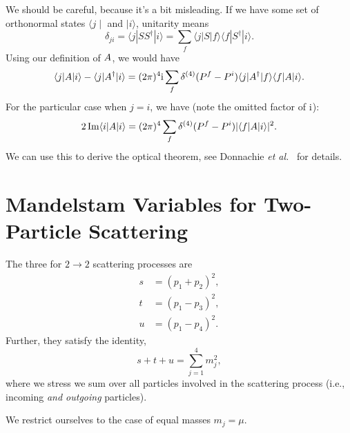 \M
We should be careful, because it's a bit misleading. If we have some set
of orthonormal states $\langle j\mid$ and $\mid i\rangle$, unitarity
means
\begin{equation}
  \delta_{ji} = \langle j| SS^{\dagger}| i\rangle
  =\sum_{f}\langle j| S| f\rangle\langle f| S^{\dagger}| i\rangle.
\end{equation}
Using our definition of $A$, we would have
\begin{equation}
\langle j|A|i\rangle - \langle j|A^{\dagger}|i\rangle
=(2\pi)^{4}\mathrm{i}\sum_{f}\delta^{(4)}(P^{f}-P^{i})
\langle j|A^{\dagger}|f\rangle\langle f|A|i\rangle.
\end{equation}
For the particular case when $j=i$, we have (note the omitted factor of $\mathrm{i}$):
\begin{equation}
2\operatorname{Im}\langle i|A|i\rangle
=(2\pi)^{4}\sum_{f}\delta^{(4)}(P^{f}-P^{i}) |\langle f|A|i\rangle|^{2}.
\end{equation}
We can use this to derive the optical theorem, see Donnachie \textit{et al.}~\cite[esp.~\S\S1.2--1.3]{Donnachie:2002en}
for details.

\section{Mandelstam Variables for Two-Particle Scattering}

\begin{definition}
  The three  for $2\to2$ scattering
  processes are
  \begin{subequations}
    \begin{align}
      s &= (p_{1} + p_{2})^{2},\\
      t &= (p_{1} - p_{3})^{2},\\
      u &= (p_{1} - p_{4})^{2}.
    \end{align}
  \end{subequations}
  Further, they satisfy the identity,
  \begin{equation}
s + t + u = \sum^{4}_{j=1}m_{j}^{2},
  \end{equation}
  where we stress we sum over all particles involved in the scattering
  process (i.e., incoming \emph{and outgoing} particles).
\end{definition}

 We restrict ourselves to the case of equal masses
$m_{j}=\mu$.

